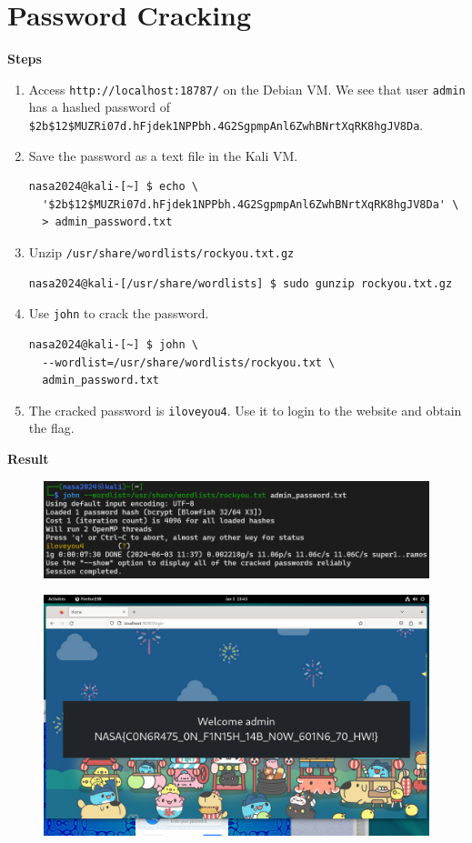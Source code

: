 \documentclass[12pt, a4paper]{article}
\begin{document}
  \section{Password Cracking}
  \textbf{Steps}
  \begin{enumerate}
    \item Access \verb|http://localhost:18787/| on the Debian VM. We
    see that user \verb|admin| has a hashed password of
    \verb|$2b$12$MUZRi07d.hFjdek1NPPbh.4G2SgpmpAnl6ZwhBNrtXqRK8hgJV8Da|.
    \item Save the password as a text file in the Kali VM.
    \begin{Verbatim}[frame=single]
nasa2024@kali-[~] $ echo \
  '$2b$12$MUZRi07d.hFjdek1NPPbh.4G2SgpmpAnl6ZwhBNrtXqRK8hgJV8Da' \
  > admin_password.txt
    \end{Verbatim}
    \item Unzip \verb|/usr/share/wordlists/rockyou.txt.gz|
    \begin{Verbatim}[frame=single]
nasa2024@kali-[/usr/share/wordlists] $ sudo gunzip rockyou.txt.gz
    \end{Verbatim}
    \item Use \verb|john| to crack the password.
    \begin{Verbatim}[frame=single]
nasa2024@kali-[~] $ john \
  --wordlist=/usr/share/wordlists/rockyou.txt \
  admin_password.txt
    \end{Verbatim}
    \item The cracked password is \verb|iloveyou4|. Use it to login to the website and
    obtain the flag.
  \end{enumerate}

  \textbf{Result}
  \begin{figure}[H]
    \includegraphics[width=\linewidth]{john.png}
  \end{figure}
  \begin{figure}[H]
    \includegraphics[width=\linewidth]{flag2.png}
  \end{figure}
\end{document}
